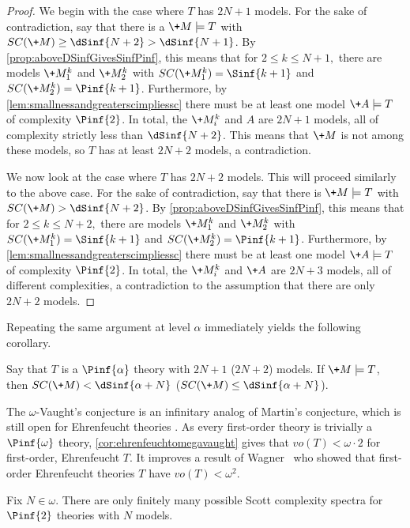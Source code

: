 \documentclass[10pt,a4paper]{amsart}
\renewcommand{\-}{\text{-}}
\begin{document}
\begin{proof}
We begin with the case where $T$ has $2N+1$ models.
For the sake of contradiction, say that there is a $\+M\models T$ with $SC(\+M)\geq\dSinf{N+2}>\dSinf{N+1}$.
By \cref{prop:aboveDSinfGivesSinfPinf}, this means that for $2\leq k\leq N+1,$ there are models $\+M^k_1$ and $\+M^k_2$ with $SC(\+M^k_1)=\Sinf{k+1}$ and $SC(\+M^k_2)=\Pinf{k+1}$.
Furthermore, by \cref{lem:smallnessandgreaterscimpliessc} there must be at least one model $\+A\models T$ of complexity $\Pinf{2}$.
In total, the $\+M^k_i$ and $A$ are $2N+1$ models, all of complexity strictly less than $\dSinf{N+2}$.
This means that $\+M$ is not among these models, so $T$ has at least $2N+2$ models, a contradiction.

We now look at the case where $T$ has $2N+2$ models.
This will proceed similarly to the above case.
For the sake of contradiction, say that there is $\+M\models T$ with $SC(\+M)>\dSinf{N+2}$.
By \cref{prop:aboveDSinfGivesSinfPinf}, this means that for $2\leq k\leq N+2,$ there are models $\+M^k_1$ and $\+M^k_2$ with $SC(\+M^k_1)=\Sinf{k+1}$ and $SC(\+M^k_2)=\Pinf{k+1}$.
Furthermore, by \cref{lem:smallnessandgreaterscimpliessc} there must be at least one model $\+A\models T$ of complexity $\Pinf{2}$.
In total, the $\+M^k_i$ and $\+A$ are $2N+3$ models, all of different complexities, a contradiction to the assumption that there are only $2N+2$ models.
\end{proof}

Repeating the same argument at level $\alpha$ immediately yields the following corollary.

\begin{corollary}
Say that $T$ is a $\Pinf{\alpha}$ theory with $2N+1$ ($2N+2$) models.
If $\+M\models T$, then $SC(\+M)<\dSinf{\alpha+N}$ ($SC(\+M)\leq\dSinf{\alpha+N}$).
\end{corollary}
\ehrenfeuchtomegavaught

The $\omega$-Vaught's conjecture is an infinitary analog of Martin's conjecture, which is still open for Ehrenfeucht theories \cite[Problem 7]{PT25}. As every first-order theory is trivially a $\Pinf{\omega}$ theory, \cref{cor:ehrenfeuchtomegavaught} gives that $vo(T)<\omega\cdot2$ for first-order, Ehrenfeucht $T$. It improves a result of Wagner~\cite{Wag82} who showed that first-order Ehrenfeucht theories $T$ have $vo(T)<\omega^2$.

\begin{corollary}
Fix $N\in\omega$. There are only finitely many possible Scott complexity spectra for $\Pinf{2}$ theories with $N$ models.
\end{corollary}
\end{document}
